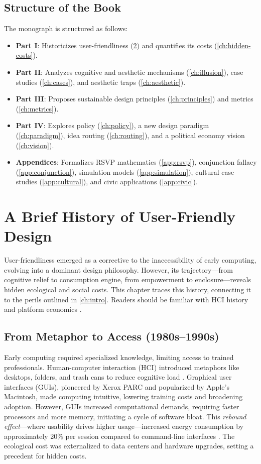 \documentclass[openany]{book}
\begin{document}
\section{Structure of the Book}
\label{sec:intro-structure}
The monograph is structured as follows:
\begin{itemize}
  \item \textbf{Part I}: Historicizes user-friendliness (\cref{ch:history}) and quantifies its costs (\cref{ch:hidden-costs}).
  \item \textbf{Part II}: Analyzes cognitive and aesthetic mechanisms (\cref{ch:illusion}), case studies (\cref{ch:cases}), and aesthetic traps (\cref{ch:aesthetic}).
  \item \textbf{Part III}: Proposes sustainable design principles (\cref{ch:principles}) and metrics (\cref{ch:metrics}).
  \item \textbf{Part IV}: Explores policy (\cref{ch:policy}), a new design paradigm (\cref{ch:paradigm}), idea routing (\cref{ch:routing}), and a political economy vision (\cref{ch:vision}).
  \item \textbf{Appendices}: Formalizes RSVP mathematics (\cref{app:rsvp}), conjunction fallacy (\cref{app:conjunction}), simulation models (\cref{app:simulation}), cultural case studies (\cref{app:cultural}), and civic applications (\cref{app:civic}).
\end{itemize}

\chapter{A Brief History of User-Friendly Design}
\label{ch:history}

User-friendliness emerged as a corrective to the inaccessibility of early computing, evolving into a dominant design philosophy. However, its trajectory---from cognitive relief to consumption engine, from empowerment to enclosure---reveals hidden ecological and social costs. This chapter traces this history, connecting it to the perils outlined in \cref{ch:intro}. Readers should be familiar with HCI history and platform economics \citep{norman1988,doctorow2022}.

\section{From Metaphor to Access (1980s--1990s)}
\label{sec:history-metaphor}
Early computing required specialized knowledge, limiting access to trained professionals. Human-computer interaction (HCI) introduced metaphors like desktops, folders, and trash cans to reduce cognitive load \citep{norman1988}. Graphical user interfaces (GUIs), pioneered by Xerox PARC and popularized by Apple’s Macintosh, made computing intuitive, lowering training costs and broadening adoption. However, GUIs increased computational demands, requiring faster processors and more memory, initiating a cycle of software bloat. This \emph{rebound effect}---where usability drives higher usage---increased energy consumption by approximately 20\% per session compared to command-line interfaces \citep{extentia2024}. The ecological cost was externalized to data centers and hardware upgrades, setting a precedent for hidden costs.
\end{document}
